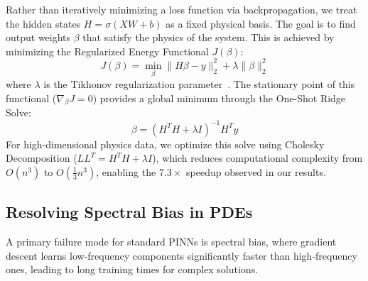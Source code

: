 \documentclass[final,12pt,3p,times,fleqn]{elsarticle}
\begin{document}
Rather than iteratively minimizing a loss function via backpropagation, we treat the hidden states $H = \sigma(XW + b)$ as a fixed physical basis. The goal is to find output weights $\beta$ that satisfy the physics of the system. This is achieved by minimizing the Regularized Energy Functional $J(\beta)$:
$$J(\beta) = \min_{\beta} \| H\beta - y \|^2_2 + \lambda \|\beta\|^2_2$$
where $\lambda$ is the Tikhonov regularization parameter~\cite{tikhonov1977solutions}. The stationary point of this functional ($\nabla_\beta J = 0$) provides a global minimum through the One-Shot Ridge Solve:
$$\beta = (H^T H + \lambda I)^{-1} H^T y$$
For high-dimensional physics data, we optimize this solve using Cholesky Decomposition ($L L^T = H^T H + \lambda I$), which reduces computational complexity from $O(n^3)$ to $O(\frac{1}{3} n^3)$, enabling the $7.3\times$ speedup observed in our results. 

\bigskip
\noindent{}
\bigskip

\subsection{Resolving Spectral Bias in PDEs}

A primary failure mode for standard PINNs is spectral bias, where gradient descent learns low-frequency components significantly faster than high-frequency ones, leading to long training times for complex solutions.
\end{document}
